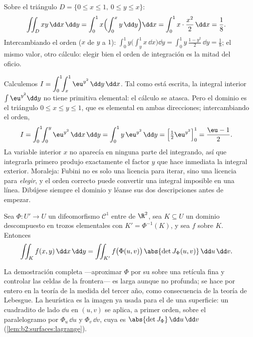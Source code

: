 \begin{example}\label{ex:b2:multint:triangle}
Sobre el triángulo $D = \{0 \leq x \leq 1,\ 0 \leq y \leq x\}$:
\[
\iint_D xy \,\dd x\,\dd y
= \int_0^1 x\Bigl(\int_0^x y\,\dd y\Bigr)\dd x
= \int_0^1 x\cdot\frac{x^2}{2}\,\dd x = \frac18 .
\]
Intercambiando el orden ($x$ de $y$ a $1$): $\int_0^1
y\bigl(\int_y^1 x\,\dd x\bigr)\dd y = \int_0^1 y\,\frac{1 -
y^2}{2}\,\dd y = \frac18$; el mismo valor, otro cálculo: elegir bien
el orden de integración es la mitad del oficio.
\end{example}

\begin{example}\label{ex:b2:multint:swaporder}
Calculemos $I = \displaystyle\int_0^1\!\!\int_x^1
\eu^{y^2}\,\dd y\,\dd x$. Tal como está escrita, la integral interior
$\int\eu^{y^2}\dd y$ no tiene primitiva elemental: el cálculo se
atasca. Pero el dominio es el triángulo $0 \leq x \leq y \leq 1$, que
es elemental en ambas direcciones; intercambiando el orden,
\[
I = \int_0^1\!\!\int_0^y \eu^{y^2}\,\dd x\,\dd y
= \int_0^1 y\,\eu^{y^2}\,\dd y
= \Bigl[\tfrac12\eu^{y^2}\Bigr]_0^1 = \frac{\eu - 1}{2} .
\]
La variable interior $x$ no aparecía en ninguna parte del integrando,
así que integrarla primero produjo exactamente el factor $y$ que hace
inmediata la integral exterior. Moraleja: Fubini no es solo una
licencia para iterar, sino una licencia para \emph{elegir}, y el
orden correcto puede convertir una integral imposible en una línea.
Dibújese siempre el dominio y léanse sus dos descripciones antes de
empezar.
\end{example}

\begin{theorem}\label{thm:b2:multint:changevar}
Sea $\Phi \colon U' \to U$ un difeomorfismo $\mathcal{C}^1$ entre
 de $\R^2$, sea $K \subseteq U$ un dominio 
descompuesto en trozos elementales con $K' = \Phi^{-1}(K)$, y sea $f$
 sobre $K$. Entonces
\[
\iint_K f(x, y)\,\dd x\,\dd y
= \iint_{K'} f\bigl(\Phi(u, v)\bigr)\,
\abs{\det J_\Phi(u, v)}\,\dd u\,\dd v .
\]
\end{theorem}
\admitted

\begin{remark}
La demostración completa ---aproximar $\Phi$ por su  sobre
una retícula fina y controlar las celdas de la frontera--- es larga
aunque no profunda; se hace por entero en la teoría de la medida del
tercer año, como consecuencia de la teoría de Lebesgue. La heurística
es la imagen ya usada para el  de una superficie: un cuadradito
de lado $\dd u$ en $(u, v)$ se aplica, a primer orden, sobre el
paralelogramo  por $\Phi_u\,\dd u$ y $\Phi_v\,\dd v$, cuya
 es $\abs{\det J_\Phi}\,\dd u\,\dd v$
(\cref{lem:b2:surfaces:lagrange}).
\end{remark}


